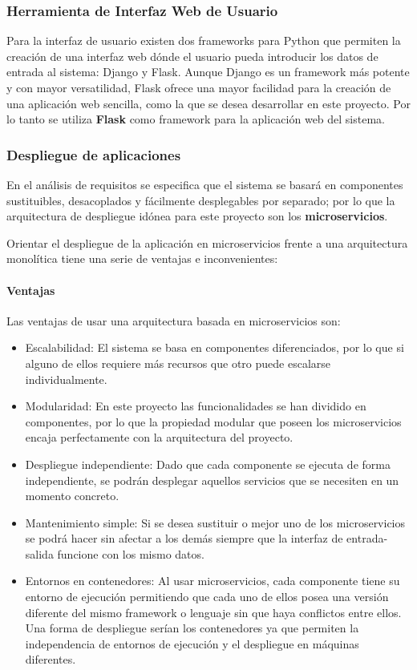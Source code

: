 \documentclass[../main.tex]{subfiles}
\begin{document}
\subsubsection{Herramienta de Interfaz Web de Usuario}\label{subsub:at-flask}
Para la interfaz de usuario existen dos frameworks para Python que permiten la creación de una interfaz web dónde el usuario pueda introducir los datos de entrada al sistema: Django y Flask. Aunque Django\cite{Hourieh2008} es un framework más potente y con mayor versatilidad, Flask\cite{ArmashAslam} ofrece una mayor facilidad para la creación de una aplicación web sencilla, como la que se desea desarrollar en este proyecto\cite{MolinaRios2016}. Por lo tanto se utiliza \textbf{Flask} como framework para la aplicación web del sistema.

\subsubsection{Despliegue de aplicaciones}\label{subsub:at-vagrant}
En el análisis de requisitos se especifica que el sistema se basará en componentes sustituibles, desacoplados y fácilmente desplegables por separado; por lo que la arquitectura de despliegue idónea para este proyecto son los \textbf{\gls{microservicios}}.

Orientar el despliegue de la aplicación en microservicios frente a una arquitectura monolítica tiene una serie de ventajas e inconvenientes:

\paragraph{Ventajas}
Las ventajas de usar una arquitectura basada en microservicios son:
\begin{itemize}
    \item Escalabilidad: El sistema se basa en componentes diferenciados, por lo que si alguno de ellos requiere más recursos que otro puede escalarse individualmente.
    \item Modularidad: En este proyecto las funcionalidades se han dividido en componentes, por lo que la propiedad modular que poseen los microservicios encaja perfectamente con la arquitectura del proyecto.
    \item Despliegue independiente: Dado que cada componente se ejecuta de forma independiente, se podrán desplegar aquellos servicios que se necesiten en un momento concreto.
    \item Mantenimiento simple: Si se desea sustituir o mejor uno de los microservicios se podrá hacer sin afectar a los demás siempre que la interfaz de entrada-salida funcione con los mismo datos.
    \item Entornos en contenedores: Al usar microservicios, cada componente tiene su entorno de ejecución permitiendo que cada uno de ellos posea una versión diferente del mismo framework o lenguaje sin que haya conflictos entre ellos. Una forma de despliegue serían los contenedores ya que permiten la independencia de entornos de ejecución y el despliegue en máquinas diferentes.
\end{itemize}
\end{document}
